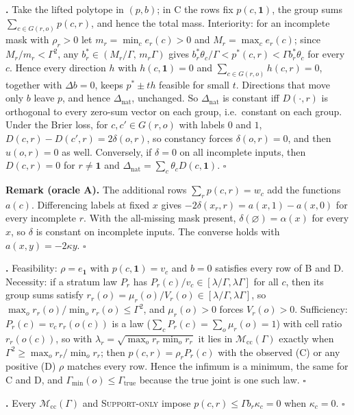 \documentclass{article}
\theoremstyle{plain}
\theoremstyle{definition}
\theoremstyle{remark}
\newcommand{\one}{\mathbf{1}}
\newcommand{\Dnat}{\Delta_{\mathrm{nat}}}
\newcommand{\Mcc}{\mathcal{M}_{\mathrm{cc}}}
\begin{document}
\textbf{.} Take the lifted polytope in $(p,b)$; in C the rows
fix $p(c,\one)$, the group sums $\sum_{c\in G(r,o)}p(c,r)$, and hence the
total mass. Interiority: for an incomplete mask with $\rho_r>0$ let
$m_r=\min_ce_r(c)>0$ and $M_r=\max_ce_r(c)$; since $M_r/m_r<\Gamma^2$, any
$b^*_r\in(M_r/\Gamma,\,m_r\Gamma)$ gives
$b^*_r\theta_c/\Gamma<p^*(c,r)<\Gamma b^*_r\theta_c$ for every $c$. Hence
every direction $h$ with $h(c,\one)=0$ and
$\sum_{c\in G(r,o)}h(c,r)=0$, together with $\Delta b=0$, keeps
$p^*\pm th$ feasible for small $t$. Directions that move only $b$ leave $p$,
and hence $\Dnat$, unchanged. So $\Dnat$ is constant iff $D(\cdot,r)$ is
orthogonal to every zero-sum vector on each group, i.e.\ constant on each
group. Under the Brier loss, for $c,c'\in G(r,o)$ with labels $0$ and $1$,
$D(c,r)-D(c',r)=2\delta(o,r)$, so constancy forces $\delta(o,r)=0$, and then
$u(o,r)=0$ as well. Conversely, if $\delta=0$ on all incomplete inputs, then
$D(c,r)=0$ for $r\neq\one$ and $\Dnat=\sum_c\theta_cD(c,\one)$. $\square$

\textbf{Remark (oracle A).} The additional rows $\sum_rp(c,r)=w_c$ add the
functions $a(c)$. Differencing labels at fixed $x$ gives
$-2\delta(x_r,r)=a(x,1)-a(x,0)$ for every incomplete $r$. With the all-missing
mask present, $\delta(\varnothing)=\alpha(x)$ for every $x$, so $\delta$ is
constant on incomplete inputs. The converse holds with $a(x,y)=-2\kappa y$.
$\square$

\textbf{.} Feasibility: $\rho=e_{\one}$ with $p(c,\one)=v_c$ and
$b=0$ satisfies every row of B and D. Necessity: if a stratum law $P_r$ has
$P_r(c)/v_c\in[\lambda/\Gamma,\lambda\Gamma]$ for all $c$, then its group sums
satisfy $r_r(o)=\mu_r(o)/V_r(o)\in[\lambda/\Gamma,\lambda\Gamma]$, so
$\max_o r_r(o)/\min_o r_r(o)\le\Gamma^2$, and $\mu_r(o)>0$ forces $V_r(o)>0$.
Sufficiency: $P_r(c)=v_c\,r_r(o(c))$ is a law ($\sum_cP_r(c)=\sum_o\mu_r(o)=1$)
with cell ratio $r_r(o(c))$, so with $\lambda_r=\sqrt{\max_or_r\min_or_r}$ it
lies in $\Mcc(\Gamma)$ exactly when $\Gamma^2\ge\max_or_r/\min_or_r$; then
$p(c,r)=\rho_rP_r(c)$ with the observed (C) or any positive (D) $\rho$
matches every row. Hence the infimum is a minimum, the same for C and D, and
$\Gamma_{\min}(o)\le\Gamma_{\mathrm{true}}$ because the true joint is one such
law. $\square$

\textbf{.} Every $\Mcc(\Gamma)$ and \textsc{Support-only}
impose $p(c,r)\le\Gamma b_r\kappa_c=0$ when $\kappa_c=0$. $\square$
\end{document}
